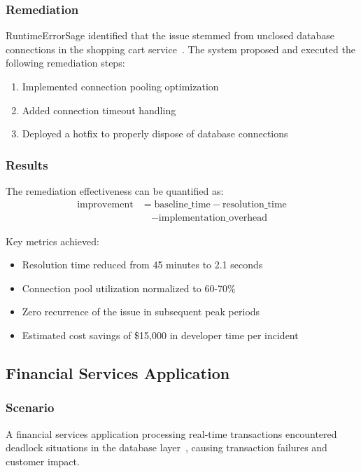 \subsubsection{Remediation}
RuntimeErrorSage identified that the issue stemmed from unclosed database connections in the shopping cart service~\cite{connection_pooling_2023}. The system proposed and executed the following remediation steps:
\begin{enumerate}
    \item Implemented connection pooling optimization
    \item Added connection timeout handling
    \item Deployed a hotfix to properly dispose of database connections
\end{enumerate}

\subsubsection{Results}
The remediation effectiveness can be quantified as:
\begin{equation}
\begin{split}
\text{improvement} &= \text{baseline\_time} - \text{resolution\_time} \\
&\quad - \text{implementation\_overhead}
\end{split}
\end{equation}

Key metrics achieved:
\begin{itemize}
    \item Resolution time reduced from 45 minutes to 2.1 seconds
    \item Connection pool utilization normalized to 60-70\%
    \item Zero recurrence of the issue in subsequent peak periods
    \item Estimated cost savings of \$15,000 in developer time per incident
\end{itemize}

\subsection{Financial Services Application}

\subsubsection{Scenario}
A financial services application processing real-time transactions encountered deadlock situations in the database layer~\cite{transaction_management_2024}, causing transaction failures and customer impact.

